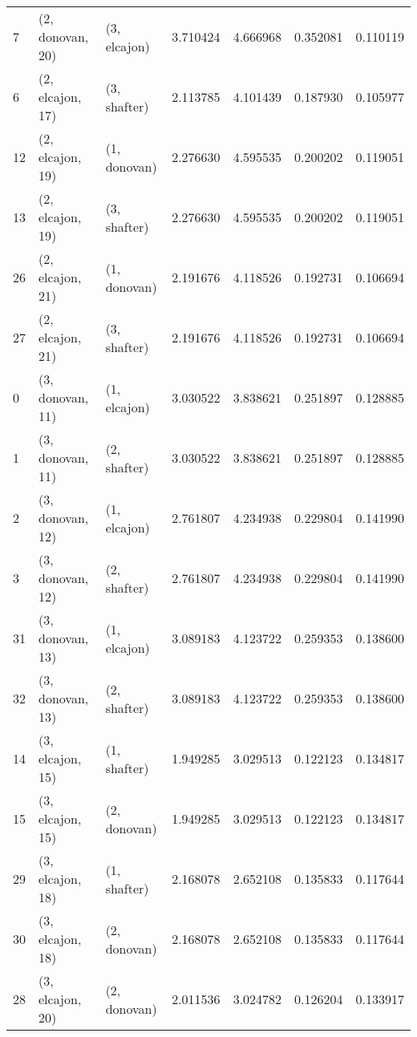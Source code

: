 \begin{tabular}{lllrrrr}
7  &  (2, donovan, 20) &     (3, elcajon) &  3.710424 &  4.666968 &   0.352081 &  0.110119 \\
6  &  (2, elcajon, 17) &     (3, shafter) &  2.113785 &  4.101439 &   0.187930 &  0.105977 \\
12 &  (2, elcajon, 19) &     (1, donovan) &  2.276630 &  4.595535 &   0.200202 &  0.119051 \\
13 &  (2, elcajon, 19) &     (3, shafter) &  2.276630 &  4.595535 &   0.200202 &  0.119051 \\
26 &  (2, elcajon, 21) &     (1, donovan) &  2.191676 &  4.118526 &   0.192731 &  0.106694 \\
27 &  (2, elcajon, 21) &     (3, shafter) &  2.191676 &  4.118526 &   0.192731 &  0.106694 \\
0  &  (3, donovan, 11) &     (1, elcajon) &  3.030522 &  3.838621 &   0.251897 &  0.128885 \\
1  &  (3, donovan, 11) &     (2, shafter) &  3.030522 &  3.838621 &   0.251897 &  0.128885 \\
2  &  (3, donovan, 12) &     (1, elcajon) &  2.761807 &  4.234938 &   0.229804 &  0.141990 \\
3  &  (3, donovan, 12) &     (2, shafter) &  2.761807 &  4.234938 &   0.229804 &  0.141990 \\
31 &  (3, donovan, 13) &     (1, elcajon) &  3.089183 &  4.123722 &   0.259353 &  0.138600 \\
32 &  (3, donovan, 13) &     (2, shafter) &  3.089183 &  4.123722 &   0.259353 &  0.138600 \\
14 &  (3, elcajon, 15) &     (1, shafter) &  1.949285 &  3.029513 &   0.122123 &  0.134817 \\
15 &  (3, elcajon, 15) &     (2, donovan) &  1.949285 &  3.029513 &   0.122123 &  0.134817 \\
29 &  (3, elcajon, 18) &     (1, shafter) &  2.168078 &  2.652108 &   0.135833 &  0.117644 \\
30 &  (3, elcajon, 18) &     (2, donovan) &  2.168078 &  2.652108 &   0.135833 &  0.117644 \\
28 &  (3, elcajon, 20) &     (2, donovan) &  2.011536 &  3.024782 &   0.126204 &  0.133917 \\
\bottomrule
\end{tabular}
